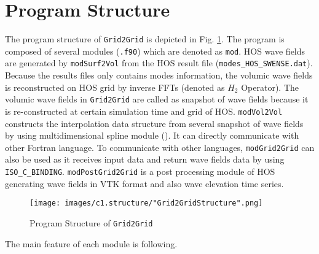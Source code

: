 \pagebreak
\section{Program Structure}

The program structure of \texttt{Grid2Grid} is depicted in Fig. \ref{fig:grid2GridStructure}. The program is composed of several modules (\texttt{.f90}) which are denoted as \texttt{mod}. HOS wave fields are generated by  \texttt{modSurf2Vol} from the HOS result file (\texttt{modes\_HOS\_SWENSE.dat}). Because the results files only contains modes information, the volumic wave fields is reconstructed on HOS grid by inverse FFTs (denoted as $H_2$ Operator). The volumic wave fields in \texttt{Grid2Grid} are called as snapshot of wave fields because it is re-constructed at certain simulation time and grid of HOS. \texttt{modVol2Vol} constructs the interpolation data structure from several snapshot of wave fields by using multidimensional spline module (\cite{BsplineWilliams}). It can directly communicate with other Fortran language. To communicate with other languages, \texttt{modGrid2Grid} can also be used as it receives input data and return wave fields data by using \texttt{ISO\_C\_BINDING}. \texttt{modPostGrid2Grid} is a post processing module of HOS generating wave fields in VTK format and also wave elevation time series.
\newline

{
    \begin{figure} [H]
    \centering
    \texttt{[image: images/c1.structure/"Grid2GridStructure".png]}
    \caption{Program Structure of \texttt{Grid2Grid}}
    \label{fig:grid2GridStructure}
    \end{figure}
}

\pagebreak

The main feature of each module is following.
\newline

